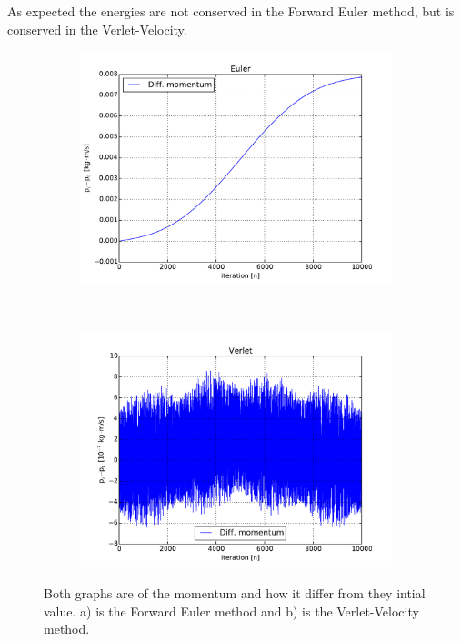  As expected the energies are not conserved in the Forward Euler method, but is conserved in the Verlet-Velocity.



\begin{figure}[H]
    \centering
    \begin{subfigure}{0.5\textwidth}
        \centering
        \includegraphics[width=\linewidth]{result/bilder/momentum-euler.pdf}
    	\caption{}
    \end{subfigure}%
    ~ 
    \begin{subfigure}{0.5\textwidth}
        \centering
        \includegraphics[width=\linewidth]{result/bilder/momentum-verlet.pdf}
        \caption{}
    \end{subfigure}
    \caption{Both graphs are of the momentum and how it differ from they intial value. a) is the Forward Euler method and b) is the Verlet-Velocity method.
    }
    \label{fig:conserved-momentum}
\end{figure}


